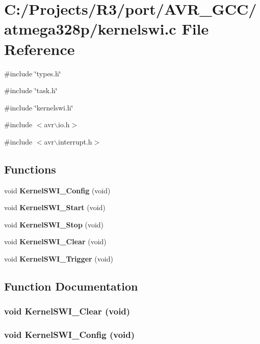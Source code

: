 \section{C:/Projects/R3/port/AVR\_\-GCC/atmega328p/kernelswi.c File Reference}
\label{kernelswi_8c}
{\ttfamily \#include \char`\"{}types.h\char`\"{}}\par
{\ttfamily \#include \char`\"{}task.h\char`\"{}}\par
{\ttfamily \#include \char`\"{}kernelswi.h\char`\"{}}\par
{\ttfamily \#include $<$avr$\backslash$io.h$>$}\par
{\ttfamily \#include $<$avr$\backslash$interrupt.h$>$}\par
\subsection*{Functions}
\begin{DoxyCompactItemize}
\item 
void {\bf KernelSWI\_\-Config} (void)
\item 
void {\bf KernelSWI\_\-Start} (void)
\item 
void {\bf KernelSWI\_\-Stop} (void)
\item 
void {\bf KernelSWI\_\-Clear} (void)
\item 
void {\bf KernelSWI\_\-Trigger} (void)
\end{DoxyCompactItemize}


\subsection{Function Documentation}
\subsubsection[{KernelSWI\_\-Clear}]{\setlength{\rightskip}{0pt plus 5cm}void KernelSWI\_\-Clear (void)}\label{kernelswi_8c_ace9181c67eb8947d5736b2c6339d31c1}
\subsubsection[{KernelSWI\_\-Config}]{\setlength{\rightskip}{0pt plus 5cm}void KernelSWI\_\-Config (void)}\label{kernelswi_8c_a785a315d8dff5a1580c8c329078c1724}
